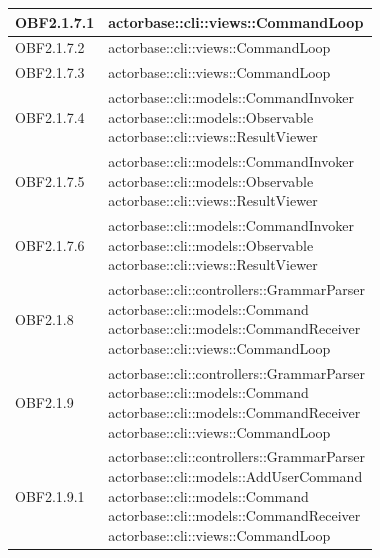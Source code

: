 \documentclass{scalatekids-article}
\begin{document}
\begin{longtable}[H]{|p{4.5cm}|p{13cm}|}
  \hline
  OBF2.1.7.1 & \multiLineCell[t]{actorbase::cli::views::CommandLoop\\}\\
  \hline
  OBF2.1.7.2 & \multiLineCell[t]{actorbase::cli::views::CommandLoop\\}\\
  \hline
  OBF2.1.7.3 & \multiLineCell[t]{actorbase::cli::views::CommandLoop\\}\\
  \hline
  OBF2.1.7.4 & \multiLineCell[t]{actorbase::cli::models::CommandInvoker\\actorbase::cli::models::Observable\\actorbase::cli::views::ResultViewer\\}\\
  \hline
  OBF2.1.7.5 & \multiLineCell[t]{actorbase::cli::models::CommandInvoker\\actorbase::cli::models::Observable\\actorbase::cli::views::ResultViewer\\}\\
  \hline
  OBF2.1.7.6 & \multiLineCell[t]{actorbase::cli::models::CommandInvoker\\actorbase::cli::models::Observable\\actorbase::cli::views::ResultViewer\\}\\
  \hline
  OBF2.1.8 & \multiLineCell[t]{actorbase::cli::controllers::GrammarParser\\actorbase::cli::models::Command\\actorbase::cli::models::CommandReceiver\\actorbase::cli::views::CommandLoop\\}\\
  \hline
  OBF2.1.9 & \multiLineCell[t]{actorbase::cli::controllers::GrammarParser\\actorbase::cli::models::Command\\actorbase::cli::models::CommandReceiver\\actorbase::cli::views::CommandLoop\\}\\
  \hline
  OBF2.1.9.1 & \multiLineCell[t]{actorbase::cli::controllers::GrammarParser\\actorbase::cli::models::AddUserCommand\\actorbase::cli::models::Command\\actorbase::cli::models::CommandReceiver\\actorbase::cli::views::CommandLoop\\}\\

\end{longtable}
\end{document}
